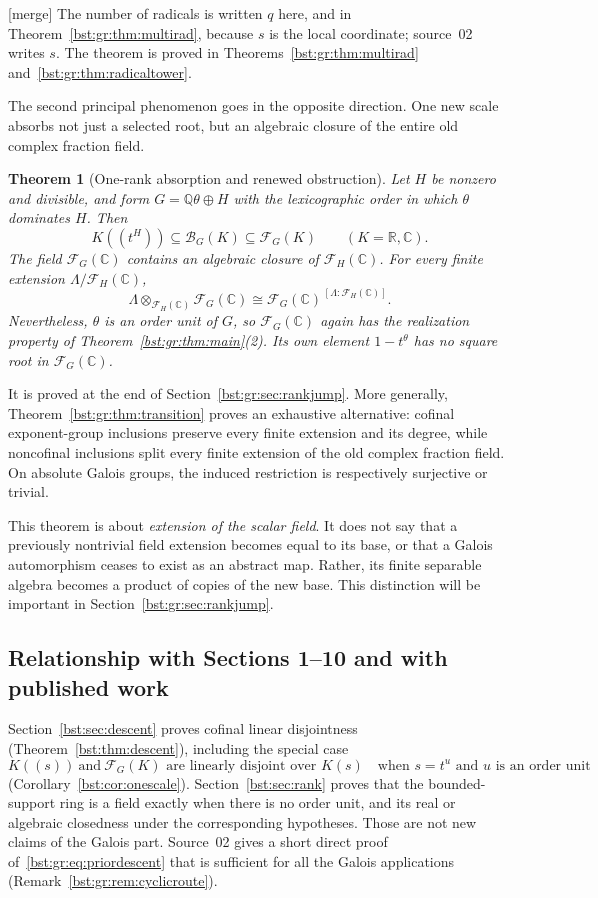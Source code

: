 \documentclass[11pt,letterpaper]{article}
\newtheorem{theorem}{Theorem}[section]
\theoremstyle{definition}
\theoremstyle{remark}
\newcommand{\Q}{\mathbb Q}
\newcommand{\R}{\mathbb R}
\newcommand{\C}{\mathbb C}
\newcommand{\HH}[2]{#1((t^{#2}))}
\newcommand{\BB}[2]{\mathcal B_{#2}(#1)}
\newcommand{\FF}[2]{\mathcal F_{#2}(#1)}
\begin{document}
\textup{[merge]} The number of radicals is written $q$ here, and in
Theorem~\ref{bst:gr:thm:multirad}, because $s$ is the local coordinate;
source~02 writes $s$. The theorem is proved in
Theorems~\ref{bst:gr:thm:multirad} and~\ref{bst:gr:thm:radicaltower}.

The second principal phenomenon goes in the opposite direction.
One new scale absorbs not just a selected root, but an algebraic closure
of the entire old complex fraction field.

\begin{theorem}[One-rank absorption and renewed obstruction]\label{bst:gr:thm:mainjump}
Let $H$ be nonzero and divisible, and form $G=\Q\theta\oplus H$ with the
lexicographic order in which $\theta$ dominates $H$. Then
\[
 \HH KH\subseteq\BB KG\subseteq\FF KG
 \qquad (K=\R,\C).
\]
The field $\FF{\C}G$ contains an algebraic closure of $\FF{\C}H$. For every
finite extension $\Lambda/\FF{\C}H$,
\[
 \Lambda\otimes_{\FF{\C}H}\FF{\C}G\cong\FF{\C}G^{\,[\Lambda:\FF{\C}H]}.
\]
Nevertheless, $\theta$ is an order unit of $G$, so $\FF{\C}G$ again has the
realization property of Theorem~\ref{bst:gr:thm:main}\textup{(2)}. Its own
element $1-t^\theta$ has no square root in $\FF{\C}G$.
\end{theorem}

It is proved at the end of Section~\ref{bst:gr:sec:rankjump}. More generally,
Theorem~\ref{bst:gr:thm:transition} proves an exhaustive alternative:
cofinal exponent-group inclusions preserve every finite extension and its
degree, while noncofinal inclusions split every finite extension of the
old complex fraction field. On absolute Galois groups, the induced
restriction is respectively surjective or trivial.

This theorem is about \emph{extension of the scalar field}. It does not
say that a previously nontrivial field extension becomes equal to its
base, or that a Galois automorphism ceases to exist as an abstract map.
Rather, its finite separable algebra becomes a product of copies of the
new base. This distinction will be important in Section~\ref{bst:gr:sec:rankjump}.

\subsection{Relationship with Sections 1--10 and with published work}\label{bst:gr:subsec:prior}

Section~\ref{bst:sec:descent} proves cofinal linear disjointness
(Theorem~\ref{bst:thm:descent}), including the special case
\begin{equation}\label{bst:gr:eq:priordescent}
 K((s))\ \text{and}\ \FF KG
      \text{ are linearly disjoint over }K(s)
      \quad\text{when }s=t^u\text{ and }u\text{ is an order unit}
\end{equation}
(Corollary~\ref{bst:cor:onescale}). Section~\ref{bst:sec:rank} proves that the
bounded-support ring is a field exactly when there is no order unit, and
its real or algebraic closedness under the corresponding hypotheses. Those
are not new claims of the Galois part. Source~02 gives a short direct proof
of~\eqref{bst:gr:eq:priordescent} that is sufficient for all the Galois
applications (Remark~\ref{bst:gr:rem:cyclicroute}).
\end{document}
